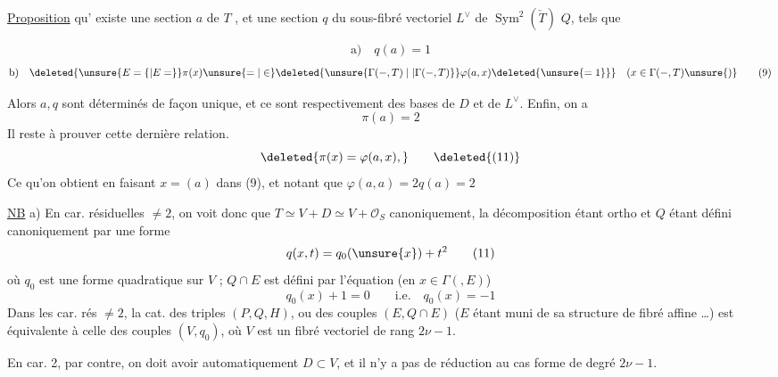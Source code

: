 \uline{Proposition}  qu' existe une  section $a$ de $T$ , et une section $q$ du sous-fibré vectoriel $L^\vee$ de $\operatorname{Sym}^2(\check T)$  $Q$, tels que

\[
\text{a)}\quad q(a)=1\tag*{(8)}
\]
\[
\text{b)}\quad\deleted{\unsure{E=\{|E=}}\pi(x)\unsure{=|\in}\deleted{\unsure{\Gamma(-,T)\mid|\Gamma(-,T)}}\varphi(a,x)\deleted{\unsure{=1\}}}\quad(x\in\Gamma(-,T)\unsure{)}
\tag*{(9)}
\]

Alors $a,q$ sont déterminés de façon unique, et ce sont respectivement des bases de $D$ et de $L^\vee$. Enfin, on a
\[
\pi(a)=2\tag*{(10)}
\]
Il reste à prouver cette dernière relation. 
\[
\deleted{\pi(x)=\varphi(a,x),}\tag*{\deleted{(11)}}
\]
Ce qu'on obtient en faisant $x=(a)$ dans (9), et notant que $\varphi(a,a)=2q(a)=2$


\uline{NB} a) En car. résiduelles $\ne2$, on voit donc que $T\simeq V+D\simeq V+\mathcal O_S$ canoniquement,  la décomposition étant ortho et $Q$ étant défini canoniquement par une forme
\[
q(x,t)=q_0(\unsure{x})+t^2\tag*{(11)}
\]
où $q_0$ est une forme quadratique sur $V$ ; $Q\cap E$ est défini par l'équation (en $x\in\Gamma(,E)$)
\[
q_0(x)+1=0\qquad\text{i.e.}\quad q_0(x)=-1\tag*{(12)}
\]
Dans les car. rés $\ne2$, la cat. des triples $(P,Q,H)$, ou des couples $(E,Q\cap E)$ ($E$ étant muni de sa structure de fibré affine \ldots) est  équivalente à celle des couples $(V,q_0)$, où $V$ est un fibré vectoriel de rang $2\nu-1$.

En car. 2, par contre, on doit avoir automatiquement $D\subset V$, et il n'y a pas\deleted{\unsure{,}} de réduction au cas  forme de degré $2\nu-1$.

